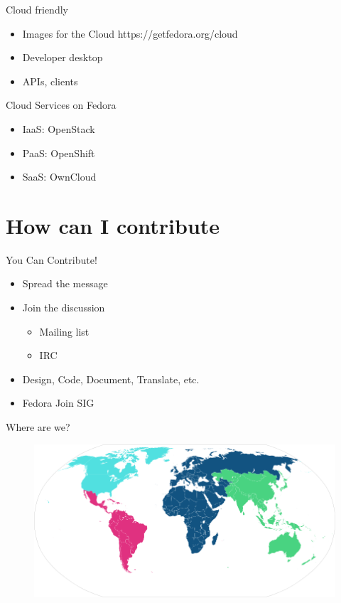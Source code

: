 \documentclass{beamer}
\begin{document}
\begin{frame}{Cloud friendly}
  \begin{itemize}
    \item Images for the Cloud https://getfedora.org/cloud
    \item Developer desktop
    \item APIs, clients
  \end{itemize}
\end{frame}

\begin{frame}{Cloud Services on Fedora}
  \begin{itemize}
    \item IaaS: OpenStack
    \item PaaS: OpenShift
    \item SaaS: OwnCloud
  \end{itemize}
\end{frame}

\section{How can I contribute}

\begin{frame}{You Can Contribute!}
  \begin{itemize}
    \item Spread the message
    \item Join the discussion
      \begin{itemize}
        \item Mailing list
        \item IRC
      \end{itemize}
    \item Design, Code, Document, Translate, etc.
    \item Fedora Join SIG
  \end{itemize}
\end{frame}

\begin{frame}{Where are we?}
  \begin{figure}[htbp]
    \centering
    \includegraphics[width=\textwidth]{Ambassador-World-Map.png}
  \end{figure}
\end{frame}
\end{document}
